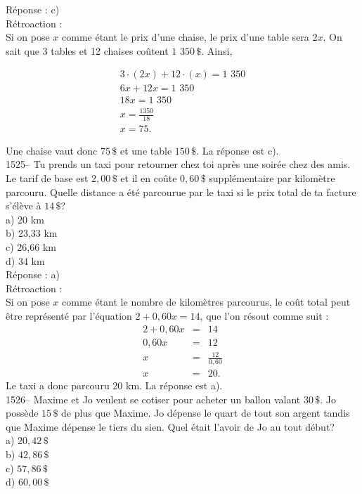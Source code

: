 R\'eponse : c)\\

R\'etroaction :\\
Si on pose $x$ comme \'etant le prix d'une chaise, le prix d'une
table sera $2x$. On sait que 3 tables et 12 chaises co\^utent $
{\textrm{1 350}}\,\$$. Ainsi,

\begin{eqnarray*}
3\cdot(2x)+12\cdot(x)={\textrm{1 350}}\\ 6x+12x={\textrm{1 350}} \\
18x={\textrm{1 350}} \\[3mm]
x=\frac{1350}{18}
\\[3mm] x=75.
\end{eqnarray*}

Une chaise vaut donc $75\,\$$ et une
table $150\,\$$. La r\'eponse est c).\\

1525-- Tu prends un taxi pour retourner chez toi apr\`es une soir\'ee
chez des amis. Le tarif de base est $2,00\,\$$ et il en co\^ute
$0,60\,\$$ suppl\'ementaire par kilom\`etre parcouru. Quelle
distance a \'et\'e parcourue par le taxi si le prix total de ta
facture
s'\'el\`eve \`a $14\,\$$?\\
a) 20 km\\
b) 23,33 km\\
c) 26,66 km\\
d) 34 km\\

R\'eponse : a)\\

R\'etroaction :\\
Si on pose $x$ comme \'etant le nombre de kilom\`etres parcourus, le
co\^ut total peut \^etre repr\'esent\'e par l'\'equation
$2+0,60x=14$, que l'on r\'esout comme suit :
\begin{eqnarray*}
2+0,60x&=&14 \\ 0,60x &=&12 \\[3mm] x&=&\frac{12}{0,60}\\[3mm]
x&=&20.
\end{eqnarray*}
Le taxi a donc parcouru 20 km. La r\'eponse est a).\\

1526-- Maxime et Jo veulent se cotiser pour acheter un ballon valant
$30\,\$$. Jo poss\`ede $15\,\$$ de plus que Maxime. Jo d\'epense le
quart de tout son argent tandis que Maxime d\'epense le tiers du
sien. Quel \'etait l'avoir de Jo au tout d\'ebut?\\
a) $20,42\,\$$\\
b) $42,86\,\$$\\
c) $57,86\,\$$\\
d) $60,00\,\$$\\

